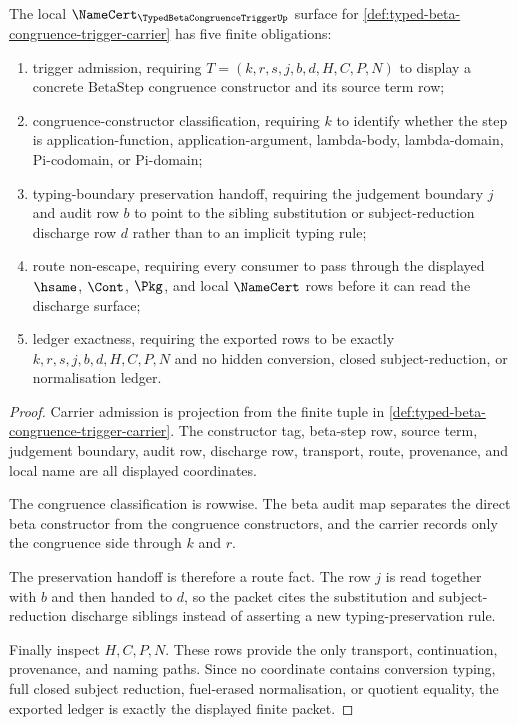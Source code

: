 \begin{theorem}
\label{thm:typed-beta-congruence-trigger-namecert-obligations}
The local $\NameCert_{\TypedBetaCongruenceTriggerUp}$ surface for \autoref{def:typed-beta-congruence-trigger-carrier} has five finite obligations:
\begin{enumerate}
\item trigger admission, requiring $T=(k,r,s,j,b,d,H,C,P,N)$ to display a concrete $\mathrm{BetaStep}$ congruence constructor and its source term row;
\item congruence-constructor classification, requiring $k$ to identify whether the step is application-function, application-argument, lambda-body, lambda-domain, Pi-codomain, or Pi-domain;
\item typing-boundary preservation handoff, requiring the judgement boundary $j$ and audit row $b$ to point to the sibling substitution or subject-reduction discharge row $d$ rather than to an implicit typing rule;
\item route non-escape, requiring every consumer to pass through the displayed $\hsame$, $\Cont$, $\Pkg$, and local $\NameCert$ rows before it can read the discharge surface;
\item ledger exactness, requiring the exported rows to be exactly $k,r,s,j,b,d,H,C,P,N$ and no hidden conversion, closed subject-reduction, or normalisation ledger.
\end{enumerate}
\end{theorem}
\begin{proof}
Carrier admission is projection from the finite tuple in \autoref{def:typed-beta-congruence-trigger-carrier}. The constructor tag, beta-step row, source term, judgement boundary, audit row, discharge row, transport, route, provenance, and local name are all displayed coordinates.

The congruence classification is rowwise. The beta audit map separates the direct beta constructor from the congruence constructors, and the carrier records only the congruence side through $k$ and $r$.

The preservation handoff is therefore a route fact. The row $j$ is read together with $b$ and then handed to $d$, so the packet cites the substitution and subject-reduction discharge siblings instead of asserting a new typing-preservation rule.

Finally inspect $H,C,P,N$. These rows provide the only transport, continuation, provenance, and naming paths. Since no coordinate contains conversion typing, full closed subject reduction, fuel-erased normalisation, or quotient equality, the exported ledger is exactly the displayed finite packet.
\end{proof}

